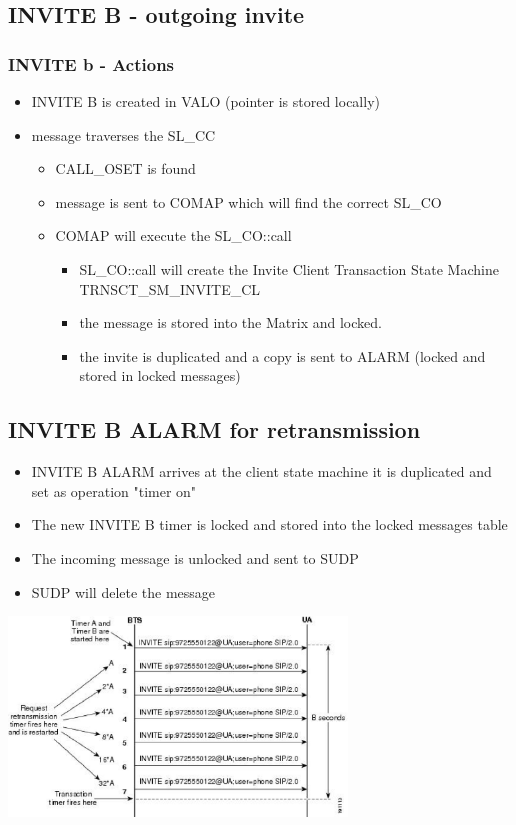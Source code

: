 \documentclass[a4paper]{article}
\begin{document}
\subsection{INVITE B - outgoing invite}
\subsubsection{INVITE b - Actions}

\begin {itemize}
\item INVITE B is created in VALO (pointer is stored locally)
\item message traverses the SL\_CC
\begin {itemize}
\item CALL\_OSET is found
\item message is sent to COMAP which will find the correct SL\_CO
\item COMAP will execute the SL\_CO::call
\begin {itemize}
\item SL\_CO::call will create the Invite Client Transaction State Machine TRNSCT\_SM\_INVITE\_CL
\item the message is stored into the Matrix and locked.
\item the invite is duplicated and a copy is sent to ALARM (locked and stored in locked messages)
\end{itemize}
\end{itemize}
\end{itemize}

\subsection{INVITE B ALARM for retransmission}

\begin {itemize}
\item INVITE B ALARM arrives at the client state machine it is duplicated and set as operation "timer on"
\item The new INVITE B timer is locked and stored into the locked messages table
\item The incoming message is unlocked and sent to SUDP
\item SUDP will delete the message
\end{itemize}

\includegraphics[width=90mm]{timerAlogic.eps}
\end{document}
